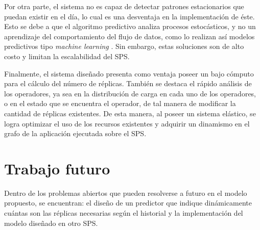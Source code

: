 Por otra parte, el sistema no es capaz de detectar patrones estacionarios que puedan existir en el día, lo cual es una desventaja en la implementación de éste. Esto se debe a que el algoritmo predictivo analiza procesos estocásticos, y no un aprendizaje del comportamiento del flujo de datos, como lo realizan así modelos predictivos tipo \textit{machine learning} \citep{bookMohri2012}. Sin embargo, estas soluciones son de alto costo y limitan la escalabilidad del SPS.

Finalmente, el sistema diseñado presenta como ventaja poseer un bajo cómputo para el cálculo del número de réplicas. También se destaca el rápido análisis de los operadores, ya sea en la distribución de carga en cada uno de los operadores, o en el estado que se encuentra el operador, de tal manera de modificar la cantidad de réplicas existentes. De esta manera, al poseer un sistema elástico, se logra optimizar el uso de los recursos existentes y adquirir un dinamismo en el grafo de la aplicación ejecutada sobre el SPS.

\section{Trabajo futuro}

Dentro de los problemas abiertos que pueden resolverse a futuro en el modelo propuesto, se encuentran: el diseño de un predictor que indique dinámicamente cuántas son las réplicas necesarias según el historial y la implementación del modelo diseñado en otro SPS.


